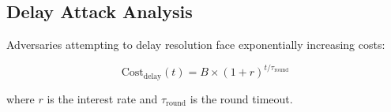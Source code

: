 \subsection{Delay Attack Analysis}

Adversaries attempting to delay resolution face exponentially increasing costs:

\begin{equation}
\text{Cost}_{\text{delay}}(t) = B \times (1 + r)^{t/\tau_{\text{round}}}
\end{equation}

where $r$ is the interest rate and $\tau_{\text{round}}$ is the round timeout.

